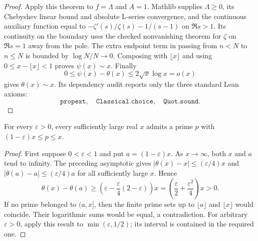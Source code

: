 \begin{proof}
Apply this theorem to $f=\Lambda$ and $A=1$.
Mathlib supplies $\Lambda\ge0$, its Chebyshev linear bound and absolute
L-series convergence, and the continuous auxiliary function equal to
$-\zeta'(s)/\zeta(s)-1/(s-1)$ on $\Re s>1$.
Its continuity on the boundary uses the checked nonvanishing theorem for
$\zeta$ on $\Re s=1$ away from the pole.
The extra endpoint term in passing from $n<N$ to $n\le N$ is bounded by
$\log N/N\to0$.
Composing with $\lfloor x\rfloor$ and using
$0\le x-\lfloor x\rfloor<1$ proves $\psi(x)\sim x$.
Finally
\[
 0\le\psi(x)-\theta(x)\le2\sqrt x\log x=o(x)
\]
gives $\theta(x)\sim x$.
Its dependency audit reports only the three standard Lean axioms:
\[
 \texttt{propext},\quad \texttt{Classical.choice},\quad \texttt{Quot.sound}.
\]
\end{proof}

\begin{lemma}
\label{construction:relative-primes}
\leanok
For every $\varepsilon>0$, every sufficiently large real $x$ admits a
prime $p$ with $(1-\varepsilon)x\le p\le x$.
\end{lemma}
\begin{proof}
First suppose $0<\varepsilon<1$ and put $a=(1-\varepsilon)x$.
As $x\to\infty$, both $x$ and $a$ tend to infinity.
The preceding asymptotic gives
$|\theta(x)-x|\le(\varepsilon/4)x$ and
$|\theta(a)-a|\le(\varepsilon/4)a$ for all sufficiently large $x$.
Hence
\[
 \theta(x)-\theta(a)\ge
 \left(\varepsilon-\frac{\varepsilon}{4}(2-\varepsilon)\right)x
 =\left(\frac{\varepsilon}{2}+\frac{\varepsilon^2}{4}\right)x>0.
\]
If no prime belonged to $(a,x]$, then the finite prime sets up to
$\lfloor a\rfloor$ and $\lfloor x\rfloor$ would coincide.
Their logarithmic sums would be equal, a contradiction.
For arbitrary $\varepsilon>0$, apply this result to
$\min(\varepsilon,1/2)$; its interval is contained in the required one.
\end{proof}

